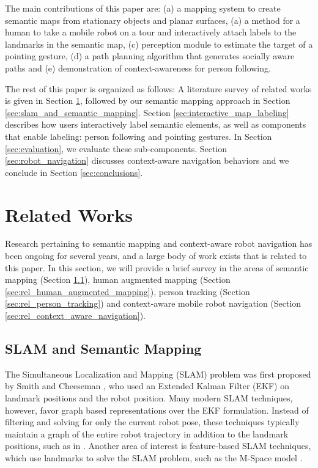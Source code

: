 \documentclass{tADR2e}
\begin{document}
The main contributions of this paper are: (a) a mapping system to create semantic maps from stationary objects and planar surfaces, (a) a method for a human to take a mobile robot on a tour and interactively attach labels to the landmarks in the semantic map, (c) perception module to estimate the target of a pointing gesture, (d) a path planning algorithm that generates socially aware paths and (e) demonstration of context-awareness for person following.

The rest of this paper is organized as follows: A literature survey of related works is given in Section \ref{sec:related_works}, followed by our semantic mapping approach in Section \ref{sec:slam_and_semantic_mapping}. Section \ref{sec:interactive_map_labeling} describes how users interactively label semantic elements, as well as components that enable labeling: person following and pointing gestures. In Section \ref{sec:evaluation}, we evaluate these sub-components. Section \ref{sec:robot_navigation} discusses context-aware navigation behaviors and we conclude in Section \ref{sec:conclusions}.

\section{Related Works}
\label{sec:related_works}

Research pertaining to semantic mapping and context-aware robot navigation has been ongoing for several years, and a large body of work exists that is related to this paper. In this section, we will provide a brief survey in the areas of semantic mapping (Section \ref{sec:rel_slam_and_semantic_mapping}), human augmented mapping (Section \ref{sec:rel_human_augmented_mapping}), person tracking (Section \ref{sec:rel_person_tracking}) and context-aware mobile robot navigation (Section \ref{sec:rel_context_aware_navigation}).

\subsection{SLAM and Semantic Mapping}
\label{sec:rel_slam_and_semantic_mapping}

The Simultaneous Localization and Mapping (SLAM) problem was first proposed by
Smith and Cheeseman \cite{smith1986representation}, who used an Extended Kalman Filter (EKF) on landmark
positions and the robot position. Many modern SLAM techniques, however, favor graph
based representations over the EKF formulation. Instead of filtering and solving for only the current robot pose,
these techniques typically maintain a graph of the entire robot trajectory in addition to the landmark positions, such as in \cite{dellaert2006square}. Another area of interest is feature-based SLAM techniques, which use
landmarks to solve the SLAM problem, such as the M-Space model \cite{folkesson2007m}.
\end{document}
